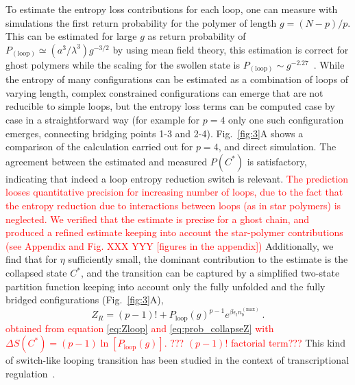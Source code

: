 \documentclass[
preprint,
a4paper,
12pt,
superscriptaddress,
pre]{revtex4}
\newcommand{\rev}[1]{\textcolor{red}{#1}}
\begin{document}
To estimate the entropy loss contributions for each loop, one can
measure with simulations the first return probability for the polymer
of length $g = (N-p)/p$. This can be estimated for large $g$ as return
probability of $P_\mathrm{(loop)} \simeq (a^3/\lambda^3) g^{-3/2}$ by
using mean field theory, this estimation is correct for ghost polymers
while the scaling for the swollen state is $P_\mathrm{(loop)} \sim
g^{-2.27}$~\cite{Marenduzzo2006c}.
%
While the entropy of many configurations can be estimated as a
combination of loops of varying length, complex constrained
configurations can emerge that are not reducible to simple loops, but
the entropy loss terms can be computed case by case in a
straightforward way (for example for $p=4$ only one such configuration
emerges, connecting bridging points 1-3 and 2-4).  Fig.~\ref{fig:3}A
shows a comparison of the calculation carried out for $p=4$, and
direct simulation.  The agreement between the estimated and
measured $P(C^*)$ is satisfactory, indicating that indeed a loop
entropy reduction switch is relevant. \rev{The prediction looses
  quantitative precision for increasing number of loops, due to the
  fact that the entropy reduction due to interactions between loops
  (as in star polymers) is
  neglected. We verified that the estimate is precise for a ghost
  chain, and produced a refined estimate keeping into account the
  star-polymer contributions (see Appendix and Fig. XXX YYY [figures
  in the appendix]) } 
%
Additionally, we find that for $\eta$ sufficiently small, the
dominant contribution to the estimate is the collapsed state $C^*$, and
the transition can be captured by a simplified two-state partition
function keeping into account only the fully unfolded and the fully
bridged configurations (Fig.~\ref{fig:3}A),
%
%
\begin{equation}
  Z_R = (p - 1)! + P_\mathrm{loop}(g)^{p-1}
            e^{\beta \epsilon_l n_b^{\mathrm{(max)}}} \ .
  \label{eq:Zloop_red}
\end{equation}
\rev{obtained from equation \ref{eq:Zloop} and \ref{eq:prob_collapseZ} with
$\Delta S(C^*) = (p - 1)\ln\left[ P_\mathrm{loop}(g)\right]$.
???  $(p-1)!$ factorial term???}
This kind of switch-like looping transition has been studied in the
context of transcriptional regulation~\cite{Saiz2006a}.
\end{document}
